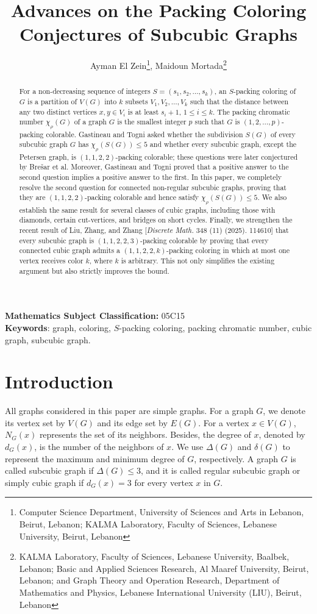 \documentclass[12pt, oneside]{scrartcl}
\author{Ayman El Zein\footnote{Computer Science Department, University of Sciences and Arts in Lebanon, Beirut, Lebanon; KALMA Laboratory, Faculty of Sciences, Lebanese University, Beirut, Lebanon}, Maidoun Mortada\footnote{KALMA Laboratory, Faculty of Sciences, Lebanese University, Baalbek, Lebanon; Basic and Applied Sciences Research, Al Maaref University, Beirut, Lebanon; and Graph Theory and Operation Research, Department of Mathematics and Physics, Lebanese International University (LIU), Beirut, Lebanon}}
\begin{document}
 
\title{Advances on the Packing Coloring Conjectures of Subcubic Graphs}
\maketitle

\begin{abstract}
For a non-decreasing sequence of integers $S=(s_1,s_2, \dots, s_k)$, an $S$-packing coloring of $G$ is a partition of $V(G)$ into $k$ subsets $V_1,V_2,\dots,V_k$ such that the distance between any two distinct vertices $x,y \in V_i$ is at least $s_{i}+1$, $1\leq i\leq k$. The packing chromatic number $\chi_{\rho}(G)$ of a graph $G$ is the smallest integer $p$ such that $G$ is $(1,2,\dots ,p)$-packing colorable. Gastineau and Togni asked whether the subdivision $S(G)$ of every subcubic graph $G$ has $\chi_{\rho}(S(G))\leq 5$ and whether every subcubic graph, except the Petersen graph, is $(1,1,2,2)$-packing colorable; these questions were later conjectured by Bre\v{s}ar et al. Moreover,  Gastineau and Togni proved that a positive answer to the second question implies a positive answer to the first. In this paper, we completely resolve the second question for connected non-regular subcubic graphs, proving that they are $(1,1,2,2)$-packing colorable and hence satisfy $\chi_{\rho}(S(G)) \leq 5$. We also establish the same result for several classes of cubic graphs, including those with diamonds, certain cut-vertices, and bridges on short cycles.
Finally, we strengthen the recent result of Liu, Zhang, and Zhang [\textit{Discrete Math.} 348 (11) (2025). 114610] that every subcubic graph is $(1,1,2,2,3)$-packing colorable by proving that every connected cubic graph admits a $(1,1,2,2,k)$-packing coloring in which at most one vertex receives color $k$, where $k$ is arbitrary. This not only simplifies the existing argument but also strictly improves the bound.\end{abstract}

\noindent\textbf{Mathematics Subject Classification:} 05C15\\
\textbf{Keywords}: graph, coloring, $S$-packing coloring, packing chromatic number, cubic graph, subcubic graph.

\section{Introduction}
All graphs considered in this paper are simple graphs. For a graph $G$, we denote its vertex set by $V(G)$ and its edge set by $E(G)$. For a vertex $x\in V(G)$, $N_G(x)$ represents the set of its neighbors. Besides, the degree of $x$, denoted by $d_G(x)$, is the number of the neighbors of $x$. We use $\Delta(G)$ and $\delta(G)$ to represent the maximum and minimum degree of $G$, respectively. A graph $G$ is called subcubic graph if $\Delta(G)\leq 3$, and it is called regular subcubic graph or simply cubic graph if $d_G(x)=3$ for every vertex $x$ in $G$. 
\end{document}
